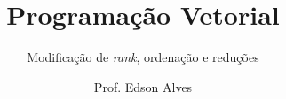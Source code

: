 \title{Programação Vetorial}
\subtitle{Modificação de {\it rank}, ordenação e reduções}
\date{}
\author{Prof. Edson Alves}
